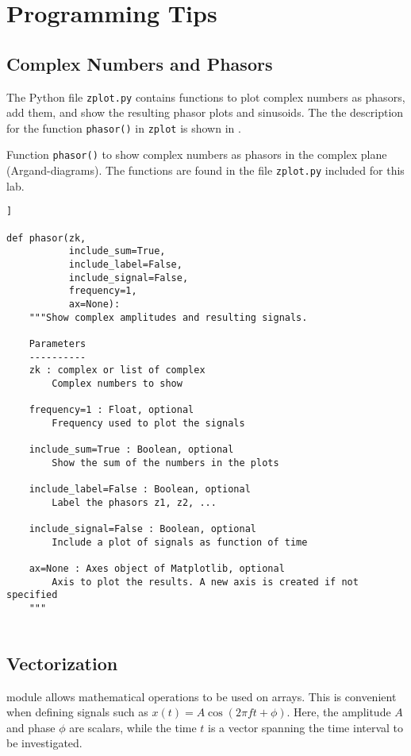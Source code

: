 \section{Programming Tips}

\subsection{Complex Numbers and Phasors}
The Python file \verb|zplot.py| contains functions to plot complex numbers as phasors, add them, and show the resulting phasor plots and sinusoids. 
The the description for the function \verb|phasor()| in  \verb|zplot|  is shown in .

\begin{table}[h!]
\caption{Function \texttt{phasor()} to show complex numbers as phasors in the complex plane (Argand-diagrams). The functions are found in the file \texttt{zplot.py} included for this lab. }
\label{tab:zplot}
\begin{lstlisting}[style=pythonstyle]]
	
def phasor(zk,
		   include_sum=True,
		   include_label=False,
		   include_signal=False,
		   frequency=1,
		   ax=None):
	"""Show complex amplitudes and resulting signals.

	Parameters
	----------
	zk : complex or list of complex
		Complex numbers to show
	
	frequency=1 : Float, optional
		Frequency used to plot the signals
	
	include_sum=True : Boolean, optional
		Show the sum of the numbers in the plots
	
	include_label=False : Boolean, optional
		Label the phasors z1, z2, ...
	
	include_signal=False : Boolean, optional
		Include a plot of signals as function of time
	
	ax=None : Axes object of Matplotlib, optional
		Axis to plot the results. A new axis is created if not specified	
	"""
	
\end{lstlisting}
\end{table}

\subsection{Vectorization}
\numpy module allows mathematical operations to be used on arrays. This is convenient when defining signals such as $x(t)=A \cos(2\pi f t + \phi)$. Here, the amplitude $A$ and phase $\phi$ are scalars, while the time $t$ is a vector spanning the time interval to be investigated. 

